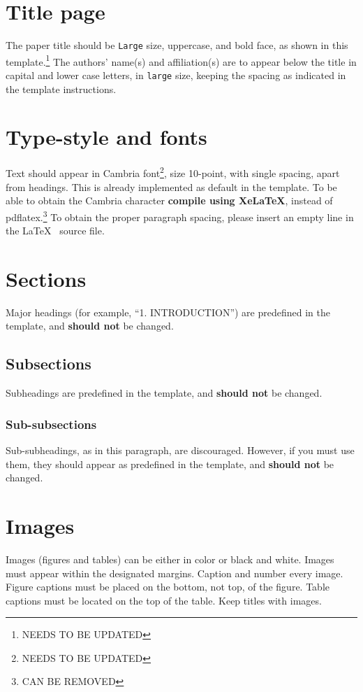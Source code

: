 \documentclass[10pt,a4paper,twocolumn]{article}
\begin{document}
\section{Title page}
\label{sec:title-page}
The paper title should be \texttt{Large} size, uppercase, and bold face, as shown in this template.\footnote{NEEDS TO BE UPDATED}
The authors' name(s) and affiliation(s) are to appear below the title in capital and lower case letters, in \texttt{large} size, keeping the spacing as indicated in the template instructions.



\section{Type-style and fonts}
\label{sec:fonts}
Text should appear in Cambria font\footnote{NEEDS TO BE UPDATED}, size 10-point, with single spacing, apart from headings.
This is already implemented as default in the template.
To be able to obtain the Cambria character \textbf{compile using XeLaTeX}, instead of pdflatex.\footnote{CAN BE REMOVED}
To obtain the proper paragraph spacing, please insert an empty line in the \LaTeX~ source file.


\section{Sections}
\label{sec:sections}
Major headings (for example, ``1. INTRODUCTION'') are predefined in the template, and \textbf{should not} be changed.

\subsection{Subsections}
\label{ssec:subsection}
Subheadings are predefined in the template, and \textbf{should not} be changed.

\subsubsection{Sub-subsections}
\label{sssec:subsubsection}
Sub-subheadings, as in this paragraph, are discouraged.
However, if you must use them, they should appear as predefined in the template, and \textbf{should not} be changed.


\section{Images}
\label{sec:images}
Images (figures and tables) can be either in color or black and white.
Images must appear within the designated margins.
Caption and number every image.
Figure captions must be placed on the bottom, not top, of the figure.
Table captions must be located on the top of the table.
Keep titles with images. 
\end{document}
